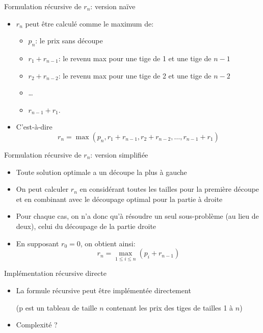 \begin{frame}{Formulation récursive de $r_n$: version naïve}
\begin{itemize}
\item $r_n$ peut être calculé comme le maximum de:
\begin{itemize}
\item $p_n$: le prix sans découpe
\item $r_1+r_{n-1}$: le revenu max pour une tige de 1 et une tige de $n-1$
\item $r_2+r_{n-2}$: le revenu max  pour une tige de 2 et une tige de $n-2$
\item \ldots
\item $r_{n-1}+r_1$.
\end{itemize}
\item C'est-à-dire $$r_n=\max(p_n,r_1+r_{n-1},r_2+r_{n-2},\ldots,r_{n-1}+r_1)$$
\end{itemize}
\end{frame}

\begin{frame}{Formulation récursive de $r_n$: version simplifiée}

\begin{itemize}
\item Toute solution optimale a un découpe la plus à gauche
\item On peut calculer $r_n$ en considérant toutes les tailles pour la première découpe et en combinant avec le découpage optimal pour la partie à droite
\item Pour chaque cas, on n'a donc qu'à résoudre un seul sous-problème (au lieu de deux), celui du découpage de la partie droite
\item En supposant $r_0=0$, on obtient ainsi:
$$r_n=\max_{1\leq i \leq n} (p_i+r_{n-1})$$
\end{itemize}


\end{frame}

\begin{frame}{Implémentation récursive directe}

\begin{itemize}
\item La formule récursive peut être implémentée directement

\bigskip

\begin{center}
{\footnotesize
{}
}
\end{center}
(p est un tableau de taille $n$ contenant les prix des tiges de tailles 1 à $n$)
\bigskip
\item Complexité ?
\end{itemize}

\end{frame}


